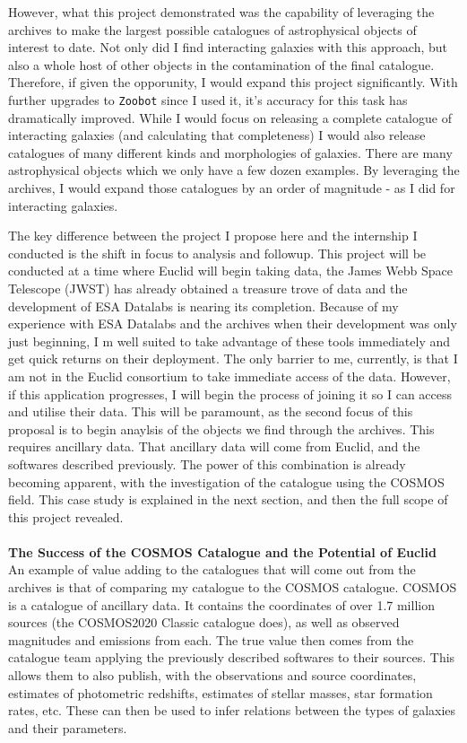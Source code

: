 \documentclass[11pt,usenatbib]{article}
\begin{document}
However, what this project demonstrated was the capability of leveraging the archives to make the largest possible catalogues of astrophysical objects of interest to date. Not only did I find interacting galaxies with this approach, but also a whole host of other objects in the contamination of the final catalogue. Therefore, if given the opporunity, I would expand this project significantly. With further upgrades to \texttt{Zoobot} since I used it, it's accuracy for this task has dramatically improved. While I would focus on releasing a complete catalogue of interacting galaxies (and calculating that completeness) I would also release catalogues of many different kinds and morphologies of galaxies. There are many astrophysical objects which we only have a few dozen examples. By leveraging the archives, I would expand those catalogues by an order of magnitude - as I did for interacting galaxies.

The key difference between the project I propose here and the internship I conducted is the shift in focus to analysis and followup. This project will be conducted at a time where Euclid will begin taking data, the James Webb Space Telescope (JWST) has already obtained a treasure trove of data and the development of ESA Datalabs is nearing its completion. Because of my experience with ESA Datalabs and the archives when their development was only just beginning, I m well suited to take advantage of these tools immediately and get quick returns on their deployment. The only barrier to me, currently, is that I am not in the Euclid consortium to take immediate access of the data. However, if this application progresses, I will begin the process of joining it so I can access and utilise their data. This will be paramount, as the second focus of this proposal is to begin anaylsis of the objects we find through the archives. This requires ancillary data. That ancillary data will come from Euclid, and the softwares described previously. The power of this combination is already becoming apparent, with the investigation of the \citet{O'Ryan} catalogue using the COSMOS field. This case study is explained in the next section, and then the full scope of this project revealed.
\\
\\
\noindent \textbf{The Success of the COSMOS Catalogue and the Potential of Euclid} \\
An example of value adding to the catalogues that will come out from the archives is that of comparing my \citet{O'Ryan} catalogue to the COSMOS catalogue. COSMOS is a catalogue of ancillary data. It contains the coordinates of over 1.7 million sources (the COSMOS2020 Classic catalogue does), as well as observed magnitudes and emissions from each. The true value then comes from the catalogue team applying the previously described softwares to their sources. This allows them to also publish, with the observations and source coordinates, estimates of photometric redshifts, estimates of stellar masses, star formation rates, etc. These can then be used to infer relations between the types of galaxies and their parameters.
\end{document}
